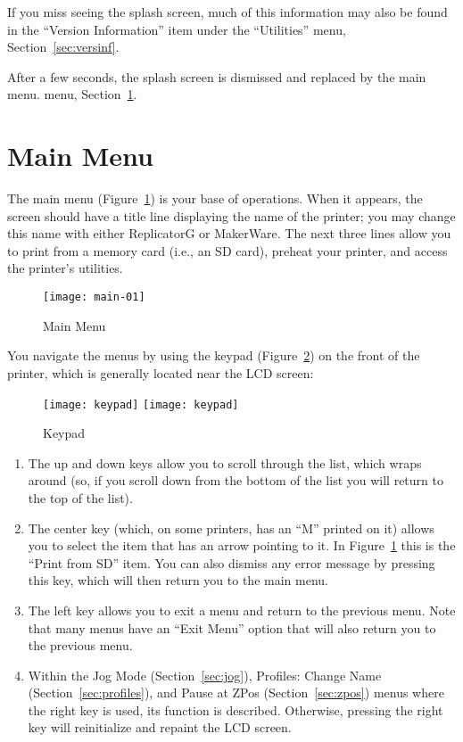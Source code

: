 If you miss seeing the splash screen, much of this information may also be found in the ``Version Information'' item under the ``Utilities'' menu, Section~\ref{sec:versinf}.

After a few seconds, the splash screen is dismissed and replaced by the main
\ifpdf
menu.
\else
menu, Section~\ref{sec:Main}.
\fi


\section{Main Menu}\label{sec:Main}

The main menu (Figure~\ref{fig:main}) is your base of operations.  When it appears, the screen should have a title line displaying the name of the printer; you may change this name with either ReplicatorG or MakerWare.  The next three lines allow you to print from a memory card (i.e., an \gls{SD card}), preheat your printer, and access the printer's utilities.  

\begin{figure}[!htbp]
  \centering
    \texttt{[image: main-01]}
    \caption{Main Menu}
  \label{fig:main}
\end{figure}

You navigate the menus by using the keypad (Figure~\ref{fig:keypad})  on the front of the printer, which is generally located near the LCD screen:

\begin{figure}[!htbp]
  \centering
\ifpdf
    \texttt{[image: keypad]}
\else
    \texttt{[image: keypad]}
\fi
    \caption{Keypad}
  \label{fig:keypad}
\end{figure}

\begin{enumerate}
\item The up and down keys allow you to scroll through the list, which wraps around (so, if you scroll down from the bottom of the list you will return to the top of the list).
\item The center key (which, on some printers, has an ``M'' printed on it) allows you to select the item that has an arrow pointing to it.  In Figure~\ref{fig:main} this is the ``Print from SD'' item.  You can also dismiss any error message by pressing this key, which will then return you to the main menu.
\item The left key allows you to exit a menu and return to the previous menu.  Note that many menus have an ``Exit Menu'' option that will also return you to the previous menu.
\item Within the Jog Mode (Section~\ref{sec:jog}), Profiles: Change Name (Section~\ref{sec:profiles}), and Pause at ZPos (Section~\ref{sec:zpos}) menus where the right key is used, its function is described.  Otherwise, pressing the right key will reinitialize and repaint the LCD screen.
\end{enumerate}

